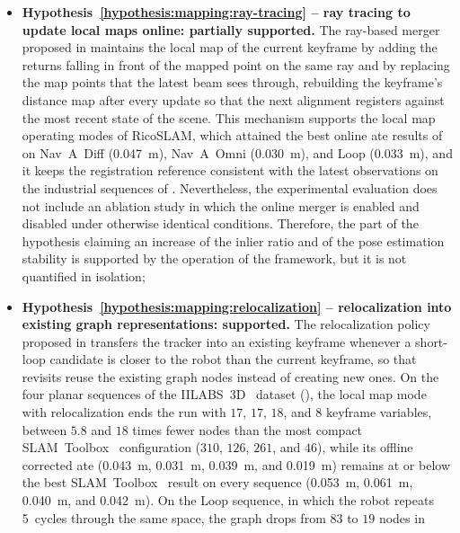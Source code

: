 \begin{itemize}
\item \textbf{Hypothesis~\ref{hypothesis:mapping:ray-tracing} --
ray tracing to update local maps online: partially supported.}
The ray-based merger proposed in  maintains
the local map of the current keyframe by adding the returns falling in front
of the mapped point on the same ray and by replacing the map points that the
latest beam sees through, rebuilding the keyframe's distance map after every
update so that the next alignment registers against the most recent state of
the scene. This mechanism supports the local map operating modes of RicoSLAM,
which attained the best online \gls{ate} results of
 on Nav~A~Diff (\SI{0.047}{\metre}),
Nav~A~Omni (\SI{0.030}{\metre}), and Loop (\SI{0.033}{\metre}), and it keeps
the registration reference consistent with the latest observations on the
industrial sequences of .
Nevertheless, the experimental evaluation does not include an ablation study
in which the online merger is enabled and disabled under otherwise identical
conditions. Therefore, the part of the hypothesis claiming an increase of the
inlier ratio and of the pose estimation stability is supported by the
operation of the framework, but it is not quantified in isolation;
\item \textbf{Hypothesis~\ref{hypothesis:mapping:relocalization} --
relocalization into existing graph representations: supported.}
The relocalization policy proposed in
 transfers the tracker into an
existing keyframe whenever a short-loop candidate is closer to the robot than
the current keyframe, so that revisits reuse the existing graph nodes instead
of creating new ones. On the four planar sequences of the
IILABS~3D~\cite{ribeiro:access:2025} dataset
(), the local map mode with
relocalization ends the run with $17$, $17$, $18$, and $8$ keyframe
variables, between $5.8$ and $18$ times fewer nodes than the most compact
SLAM~Toolbox~\cite{macenski-jambrecic:joss:2021} configuration ($310$, $126$,
$261$, and $46$), while its offline corrected \gls{ate}
(\SI{0.043}{\metre}, \SI{0.031}{\metre}, \SI{0.039}{\metre}, and
\SI{0.019}{\metre}) remains at or below the best
SLAM~Toolbox~\cite{macenski-jambrecic:joss:2021} result on every sequence
(\SI{0.053}{\metre}, \SI{0.061}{\metre}, \SI{0.040}{\metre}, and
\SI{0.042}{\metre}). On the Loop sequence, in which the robot repeats
5~cycles through the same space, the graph drops from $83$ to $19$ nodes in

\end{itemize}
